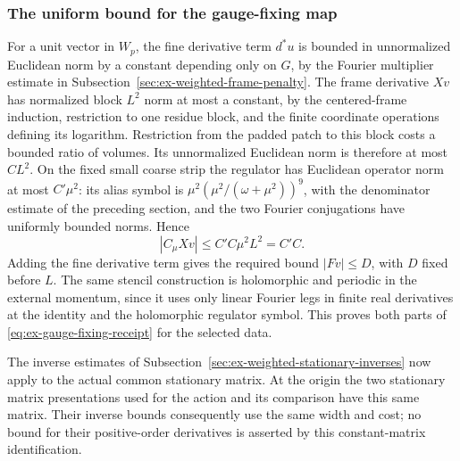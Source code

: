 \subsubsection{The uniform bound for the gauge-fixing map}
For a unit vector in $W_p$, the fine derivative term $d^*u$ is bounded
in unnormalized Euclidean norm by a constant depending only on $G$,
by the Fourier multiplier estimate in
Subsection~\ref{sec:ex-weighted-frame-penalty}. The frame derivative $Xv$
has normalized block $L^2$ norm at most a constant, by the centered-frame
induction, restriction to one residue block, and the finite coordinate
operations defining its logarithm. Restriction from the padded patch
to this block costs a bounded ratio of volumes. Its unnormalized
Euclidean norm is therefore at most $C L^2$.
On the fixed small coarse strip the regulator has Euclidean operator
norm at most $C'\mu^2$: its alias symbol is
$\mu^2(\mu^2/(\omega+\mu^2))^9$, with the denominator estimate of the
preceding section, and the two Fourier conjugations have uniformly
bounded norms. Hence
\[
                       |C_\mu Xv|\leq C'C\mu^2L^2=C'C.
\]
Adding the fine derivative term gives the required bound $|Fv|\leq D$,
with $D$ fixed before $L$. The same stencil construction is holomorphic
and periodic in the external momentum, since it uses only linear Fourier
legs in finite real derivatives at the identity and the holomorphic
regulator symbol. This proves both parts of
\eqref{eq:ex-gauge-fixing-receipt} for the selected data.

The inverse estimates of
Subsection~\ref{sec:ex-weighted-stationary-inverses} now apply to the actual
common stationary matrix. At the origin the two stationary matrix
presentations used for the action and its comparison have this same
matrix. Their inverse bounds consequently use the same width and cost;
no bound for their positive-order derivatives is asserted by this
constant-matrix identification.

